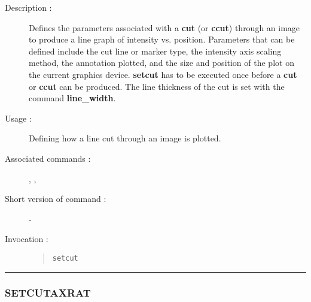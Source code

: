 \begin{description}

\item[Description :] Defines the parameters associated with a {\bf cut}
(or {\bf ccut}) through an image to produce a line graph of intensity
vs. position.  Parameters that can be defined include the cut line or
marker type, the intensity axis scaling method, the annotation plotted,
and the size and position of the plot on the current graphics device.
{\bf setcut} has to be executed once before a {\bf cut} or {\bf ccut}
can be produced.  The line thickness of the cut is set with the command
{\bf line\_width}.

\item[Usage :] Defining how a line cut through an image is plotted.

\item[Associated commands :] {\tt {}}, 
{\tt {}}, {\tt {}}

\item[Short version of command :] -
\item[Invocation :]

\begin{quote}{\tt  setcut }\end{quote}

\end{description}

\hrule 
\subsubsection*{\label{SETCUTAXRAT}SETCUTAXRAT}

